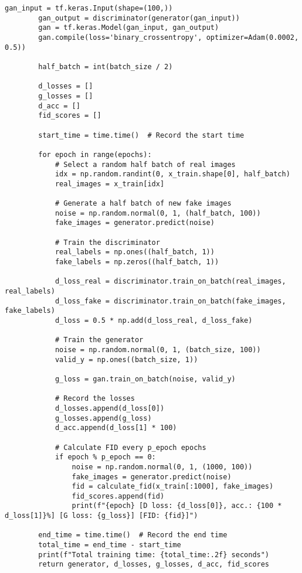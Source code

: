 \begin{lstlisting}[style=mypython, caption= {Explore GAN with 6 Convolutional Layers in Generator \\ and 5 Convolutional Layers in Discriminator}]
        gan_input = tf.keras.Input(shape=(100,))
        gan_output = discriminator(generator(gan_input))
        gan = tf.keras.Model(gan_input, gan_output)
        gan.compile(loss='binary_crossentropy', optimizer=Adam(0.0002, 0.5))
    
        half_batch = int(batch_size / 2)
        
        d_losses = []
        g_losses = []
        d_acc = []
        fid_scores = []
        
        start_time = time.time()  # Record the start time
    
        for epoch in range(epochs):
            # Select a random half batch of real images
            idx = np.random.randint(0, x_train.shape[0], half_batch)
            real_images = x_train[idx]
    
            # Generate a half batch of new fake images
            noise = np.random.normal(0, 1, (half_batch, 100))
            fake_images = generator.predict(noise)
    
            # Train the discriminator
            real_labels = np.ones((half_batch, 1))
            fake_labels = np.zeros((half_batch, 1))
    
            d_loss_real = discriminator.train_on_batch(real_images, real_labels)
            d_loss_fake = discriminator.train_on_batch(fake_images, fake_labels)
            d_loss = 0.5 * np.add(d_loss_real, d_loss_fake)
    
            # Train the generator
            noise = np.random.normal(0, 1, (batch_size, 100))
            valid_y = np.ones((batch_size, 1))
    
            g_loss = gan.train_on_batch(noise, valid_y)
    
            # Record the losses
            d_losses.append(d_loss[0])
            g_losses.append(g_loss)
            d_acc.append(d_loss[1] * 100)
            
            # Calculate FID every p_epoch epochs
            if epoch % p_epoch == 0:
                noise = np.random.normal(0, 1, (1000, 100))
                fake_images = generator.predict(noise)
                fid = calculate_fid(x_train[:1000], fake_images)
                fid_scores.append(fid)
                print(f"{epoch} [D loss: {d_loss[0]}, acc.: {100 * d_loss[1]}%] [G loss: {g_loss}] [FID: {fid}]")
    
        end_time = time.time()  # Record the end time
        total_time = end_time - start_time
        print(f"Total training time: {total_time:.2f} seconds")
        return generator, d_losses, g_losses, d_acc, fid_scores
\end{lstlisting}

